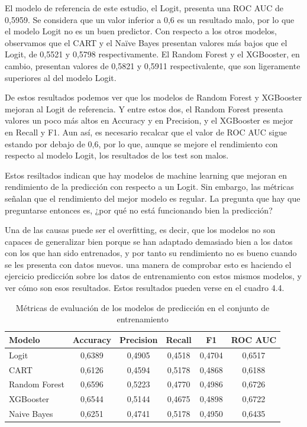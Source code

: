 El modelo de referencia de este estudio, el Logit, presenta una ROC AUC de 0,5959. Se considera que un valor inferior a 0,6 es un resultado malo, por lo que el modelo Logit no es un buen predictor. Con respecto a los otros modelos, observamos que el CART y el Naïve Bayes presentan valores más bajos que el Logit, de 0,5521 y 0,5798 respectivamente. El Random Forest y el XGBooster, en cambio, presentan valores de 0,5821 y 0,5911 respectivalente, que son ligeramente superiores al del modelo Logit.

De estos resultados podemos ver que los modelos de Random Forest y XGBooster mejoran al Logit de referencia. Y entre estos dos, el Random Forest presenta valores un poco más altos en Accuracy y en Precision, y el XGBooster es mejor en Recall y F1. Aun así, es necesario recalcar que el valor de ROC AUC sigue estando por debajo de 0,6, por lo que, aunque se mejore el rendimiento con respecto al modelo Logit, los resultados de los test son malos.

Estos resiltados indican que hay modelos de machine learning que mejoran en rendimiento de la predicción con respecto a un Logit. Sin embargo, las métricas señalan que el rendimiento del mejor modelo es regular. La pregunta que hay que preguntarse entonces es, ¿por qué no está funcionando bien la predicción?

Una de las causas puede ser el overfitting, es decir, que los modelos no son capaces de generalizar bien porque se han adaptado demasiado bien a los datos con los que han sido entrenados, y por tanto su rendimiento no es bueno cuando se les presenta con datos nuevos. una manera de comprobar esto es haciendo el ejercicio predicción sobre los datos de entrenamiento con estos mismos modelos, y ver cómo son esos resultados. Estos resultados pueden verse en el cuadro 4.4.

\begin{table}[ht]
    \centering
    \begin{tabular}{lccccc}
    \hline
        \textbf{Modelo} & \textbf{Accuracy} & \textbf{Precision} & \textbf{Recall} & \textbf{F1} & \textbf{ROC AUC} \\ \hline
        Logit & 0,6389 & 0,4905 & 0,4518 & 0,4704 & 0,6517 \\ 
        CART & 0,6126 & 0,4594 & 0,5178 & 0,4868 & 0,6188 \\ 
        Random Forest & 0,6596 & 0,5223 & 0,4770 & 0,4986 & 0,6726 \\ 
        XGBooster & 0,6544 & 0,5144 & 0,4675 & 0,4898 & 0,6722 \\ 
        Naive Bayes & 0,6251 & 0,4741 & 0,5178 & 0,4950 & 0,6435 \\ \hline
    \end{tabular}
    \caption{Métricas de evaluación de los modelos de predicción en el conjunto de entrenamiento}
\end{table}

